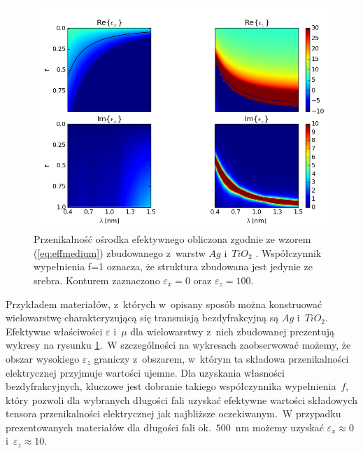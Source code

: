 \begin{figure}[tbh]
	\includegraphics[width=\textwidth]{images/multilayer/agtio2-effective.png}
	\caption{Przenikalność ośrodka efektywnego obliczona zgodnie ze wzorem (\ref{eq:effmedium})  zbudowanego z~warstw $Ag$ \cite{PhysRevB.6.4370} i~$TiO_2$ \cite{DEVORE:51}. Współczynnik wypełnienia f=1 oznacza, że struktura zbudowana jest jedynie ze srebra. Konturem zaznaczono $\varepsilon_x=0$ oraz $\varepsilon_z=100$.}
	\label{fig:multiex}
\end{figure}

Przykładem materiałów, z~których w~opisany sposób można konstruować wielowarstwę charakteryzującą się transmisją bezdyfrakcyjną są $Ag$ i~$TiO_2$. Efektywne właściwości $\varepsilon$ i~$\mu$ dla wielowarstwy z~nich zbudowanej prezentują wykresy na rysunku \ref{fig:multiex}.~W szczególności na wykresach zaobserwować możemy, że obszar wysokiego $\varepsilon_z$ graniczy z~obszarem, w~którym ta składowa przenikalności elektrycznej przyjmuje wartości ujemne. Dla uzyskania własności bezdyfrakcyjnych, kluczowe jest dobranie takiego współczynnika wypełnienia~$f$, który pozwoli dla wybranych długości fali uzyskać efektywne wartości składowych tensora przenikalności elektrycznej jak najbliższe oczekiwanym.~W przypadku prezentowanych materiałów dla długości fali ok.~$500$~nm możemy uzyskać $\varepsilon_x \approx 0$ i~$\varepsilon_z \approx 10$.







